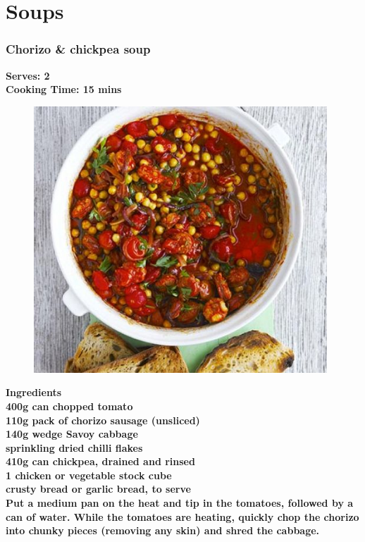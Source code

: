 \documentclass[18pt, oneside]{book}
\begin{document}
\part{Soups}

\section{Chorizo \& chickpea soup}
\bf{Serves: 2} \\
\bf{Cooking Time: 15 mins} \\

\begin{figure}[h!]
  \begin{center}
  \includegraphics[height = 10cm]{ccsoup}
  \end{center}
\end{figure}

\bf{Ingredients} \normalfont \\
400g can chopped tomato \\
110g pack of chorizo sausage (unsliced) \\
140g wedge Savoy cabbage \\
sprinkling dried chilli flakes \\
410g can chickpea, drained and rinsed \\ 
1 chicken or vegetable stock cube \\
crusty bread or garlic bread, to serve \\

Put a medium pan on the heat and tip in the tomatoes, followed by a can of water. While the tomatoes are heating, quickly chop the chorizo into chunky pieces (removing any skin) and shred the cabbage. \\
\end{document}
